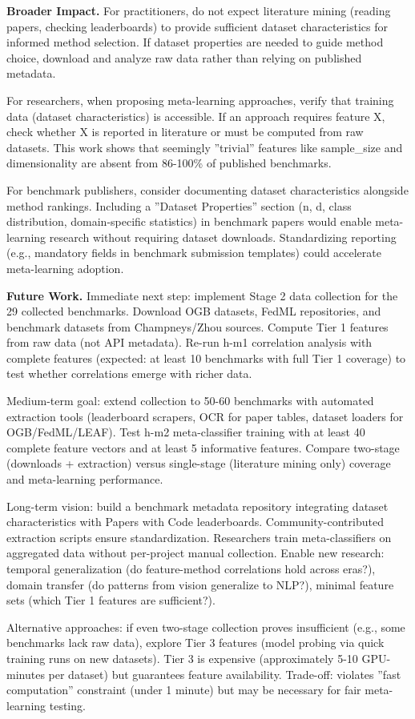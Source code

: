 \textbf{Broader Impact.} For practitioners, do not expect literature mining (reading papers, checking leaderboards) to provide sufficient dataset characteristics for informed method selection. If dataset properties are needed to guide method choice, download and analyze raw data rather than relying on published metadata.

For researchers, when proposing meta-learning approaches, verify that training data (dataset characteristics) is accessible. If an approach requires feature X, check whether X is reported in literature or must be computed from raw datasets. This work shows that seemingly ''trivial'' features like sample\_size and dimensionality are absent from 86-100\% of published benchmarks.

For benchmark publishers, consider documenting dataset characteristics alongside method rankings. Including a ''Dataset Properties'' section (n, d, class distribution, domain-specific statistics) in benchmark papers would enable meta-learning research without requiring dataset downloads. Standardizing reporting (e.g., mandatory fields in benchmark submission templates) could accelerate meta-learning adoption.

\textbf{Future Work.} Immediate next step: implement Stage 2 data collection for the 29 collected benchmarks. Download OGB datasets, FedML repositories, and benchmark datasets from Champneys/Zhou sources. Compute Tier 1 features from raw data (not API metadata). Re-run h-m1 correlation analysis with complete features (expected: at least 10 benchmarks with full Tier 1 coverage) to test whether correlations emerge with richer data.

Medium-term goal: extend collection to 50-60 benchmarks with automated extraction tools (leaderboard scrapers, OCR for paper tables, dataset loaders for OGB/FedML/LEAF). Test h-m2 meta-classifier training with at least 40 complete feature vectors and at least 5 informative features. Compare two-stage (downloads + extraction) versus single-stage (literature mining only) coverage and meta-learning performance.

Long-term vision: build a benchmark metadata repository integrating dataset characteristics with Papers with Code leaderboards. Community-contributed extraction scripts ensure standardization. Researchers train meta-classifiers on aggregated data without per-project manual collection. Enable new research: temporal generalization (do feature-method correlations hold across eras?), domain transfer (do patterns from vision generalize to NLP?), minimal feature sets (which Tier 1 features are sufficient?).

Alternative approaches: if even two-stage collection proves insufficient (e.g., some benchmarks lack raw data), explore Tier 3 features (model probing via quick training runs on new datasets). Tier 3 is expensive (approximately 5-10 GPU-minutes per dataset) but guarantees feature availability. Trade-off: violates ''fast computation'' constraint (under 1 minute) but may be necessary for fair meta-learning testing.
